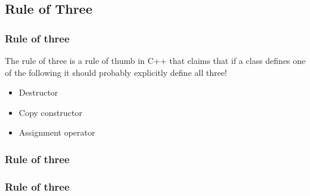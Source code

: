 \subsection{Rule of Three}

\begin{frame}[fragile]
	\frametitle{Rule of three}
	The rule of three is a rule of thumb in C++ that claims that if a class defines one of the following
	it should probably explicitly define all three!
	\begin{itemize}
	\item Destructor
	\item Copy constructor
	\item Assignment operator
	\end{itemize}
\end{frame}

\begin{frame}[fragile]
	\frametitle{Rule of three}
	{\tiny
	
	}
\end{frame}

\begin{frame}[fragile]
	\frametitle{Rule of three}
	{\tiny
	
	}
\end{frame}